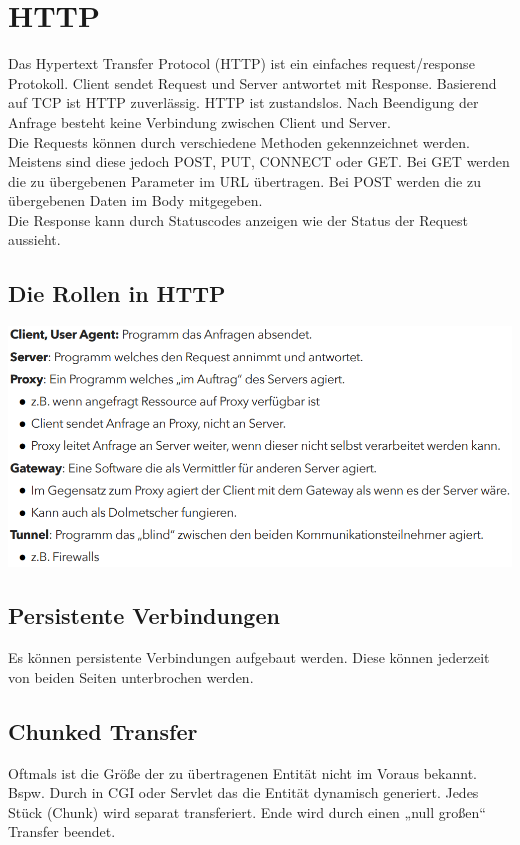 \documentclass[12pt,a4paper]{article}
\begin{document}
\section{HTTP}
Das Hypertext Transfer Protocol (HTTP) ist ein einfaches request/response Protokoll. Client sendet Request und Server antwortet mit Response. Basierend auf TCP ist HTTP zuverlässig. HTTP ist zustandslos. Nach Beendigung der Anfrage besteht keine Verbindung zwischen Client und Server.\\
Die Requests können durch verschiedene Methoden gekennzeichnet werden. Meistens sind diese jedoch POST, PUT, CONNECT oder GET. Bei GET werden die zu übergebenen Parameter im URL übertragen. Bei POST werden die zu übergebenen Daten im Body mitgegeben.\\
Die Response kann durch Statuscodes anzeigen wie der Status der Request aussieht.

\subsection{Die Rollen in HTTP}
\includegraphics[width=\textwidth]{Bilder/rollen_http.PNG}

\subsection{Persistente Verbindungen}
Es können persistente Verbindungen aufgebaut werden. Diese können jederzeit von beiden Seiten unterbrochen werden. 

\subsection{Chunked Transfer}
Oftmals ist die Größe der zu übertragenen Entität nicht im Voraus bekannt. Bspw. Durch in CGI oder Servlet das die Entität dynamisch generiert. Jedes Stück (Chunk) wird separat transferiert. Ende wird durch einen „null großen“ Transfer beendet.
\end{document}
